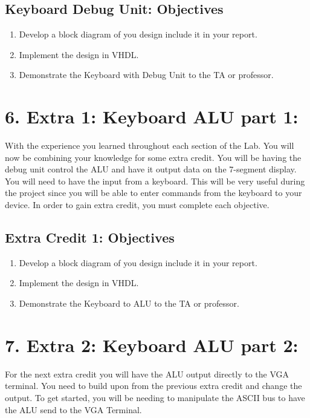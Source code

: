 \documentclass{article}
\begin{document}
\subsection{Keyboard Debug Unit: Objectives}
\begin{enumerate}
  \item Develop a block diagram of you design include it in your report.
  \item Implement the design in VHDL.
  \item Demonstrate the Keyboard with Debug Unit to the TA or professor.
\end{enumerate}


\section{6. Extra 1: Keyboard ALU part 1:}
With the experience you learned throughout each section of the Lab. You will now be combining your knowledge for some extra credit. %
You will be having the debug unit control the ALU and have it output data on the 7-segment display. You will need to have the input from a keyboard. This will be very useful during the project since you will be able to enter commands from the keyboard to your device. In order to gain extra credit, you must complete each objective. %

\subsection{Extra Credit 1: Objectives}
\begin{enumerate}
  \item Develop a block diagram of you design include it in your report.
  \item Implement the design in VHDL.
  \item Demonstrate the Keyboard to ALU to the TA or professor.
\end{enumerate}

\section{7. Extra 2: Keyboard ALU part 2:}
For the next extra credit you will have the ALU output directly to the VGA terminal. You need to build upon from the previous extra credit and change the output. To get started, you will be needing to manipulate the ASCII bus to have the ALU send to the VGA Terminal.
\end{document}
